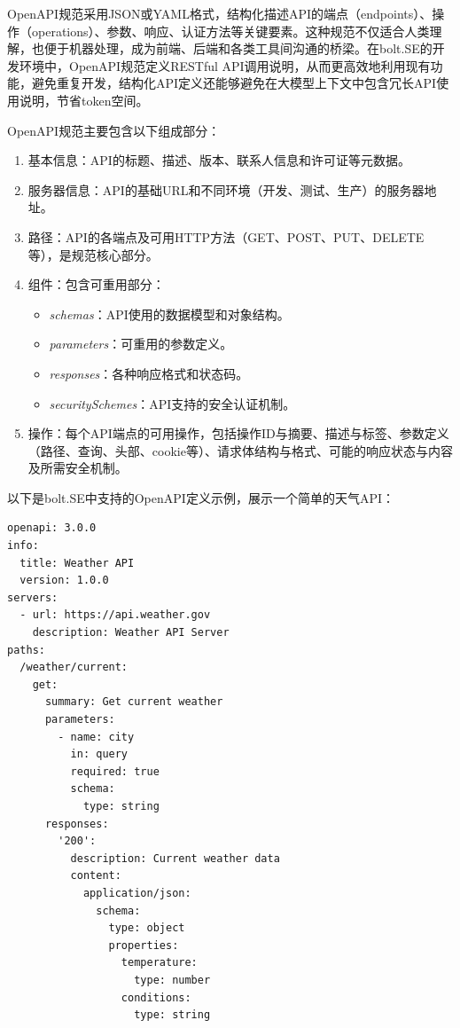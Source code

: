 OpenAPI规范采用JSON或YAML格式，结构化描述API的端点（endpoints）、操作（operations）、参数、响应、认证方法等关键要素。这种规范不仅适合人类理解，也便于机器处理，成为前端、后端和各类工具间沟通的桥梁。在bolt.SE的开发环境中，OpenAPI规范定义RESTful API调用说明，从而更高效地利用现有功能，避免重复开发，结构化API定义还能够避免在大模型上下文中包含冗长API使用说明，节省token空间。

OpenAPI规范主要包含以下组成部分\cite{openapi2023}：

\begin{enumerate}
  \item 基本信息：API的标题、描述、版本、联系人信息和许可证等元数据。
  
  \item 服务器信息：API的基础URL和不同环境（开发、测试、生产）的服务器地址。
  
  \item 路径：API的各端点及可用HTTP方法（GET、POST、PUT、DELETE等），是规范核心部分。
  
  \item 组件：包含可重用部分：
    \begin{itemize}
      \item \textit{schemas}：API使用的数据模型和对象结构。
      \item \textit{parameters}：可重用的参数定义。
      \item \textit{responses}：各种响应格式和状态码。
      \item \textit{securitySchemes}：API支持的安全认证机制。
    \end{itemize}
  
  \item 操作：每个API端点的可用操作，包括操作ID与摘要、描述与标签、参数定义（路径、查询、头部、cookie等）、请求体结构与格式、可能的响应状态与内容及所需安全机制。
\end{enumerate}

以下是bolt.SE中支持的OpenAPI定义示例，展示一个简单的天气API：

\begin{verbatim}
openapi: 3.0.0
info:
  title: Weather API
  version: 1.0.0
servers:
  - url: https://api.weather.gov
    description: Weather API Server
paths:
  /weather/current:
    get:
      summary: Get current weather
      parameters:
        - name: city
          in: query
          required: true
          schema:
            type: string
      responses:
        '200':
          description: Current weather data
          content:
            application/json:
              schema:
                type: object
                properties:
                  temperature:
                    type: number
                  conditions:
                    type: string
\end{verbatim}

